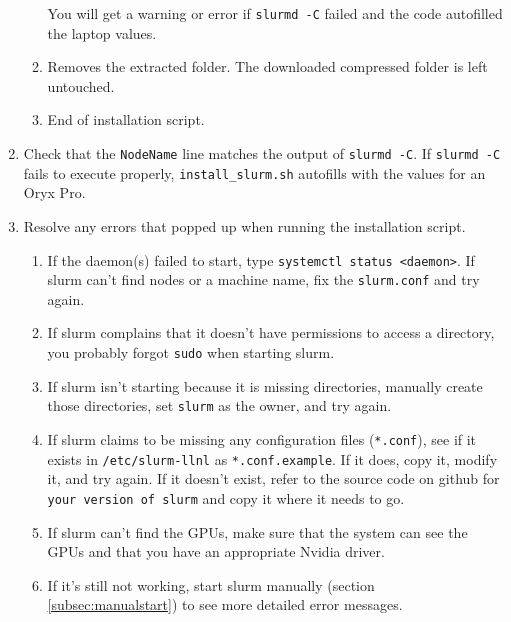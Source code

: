 \begin{enumerate}
\begin{enumerate}
	You will get a warning or error if \texttt{slurmd -C} failed and the code autofilled the laptop values.

	\item Removes the extracted folder. The downloaded compressed folder is left untouched.
	
	\item End of installation script.
	\end{enumerate}
	
\item Check that the \texttt{NodeName} line matches the output of \texttt{slurmd -C}. If \texttt{slurmd -C} fails to execute properly, \texttt{install\_slurm.sh} autofills with the values for an Oryx Pro.

\item Resolve any errors that popped up when running the installation script.

	\begin{enumerate}
	\item If the daemon(s) failed to start, type \texttt{systemctl status <daemon>}. If slurm can't find nodes or a machine name, fix the \texttt{slurm.conf} and try again. 

	\item If slurm complains that it doesn't have permissions to access a directory, you probably forgot \texttt{sudo} when starting slurm.

	\item If slurm isn't starting because it is missing directories, manually create those directories, set \texttt{slurm} as the owner, and try again.

	\item If slurm claims to be missing any configuration files (\texttt{*.conf}), see if it exists in \texttt{/etc/slurm-llnl} as \texttt{*.conf.example}. If it does, copy it, modify it, and try again. If it doesn't exist, refer to the source code on github for \texttt{your version of slurm} and copy it where it needs to go.

	\item If slurm can't find the GPUs, make sure that the system can see the GPUs and that you have an appropriate Nvidia driver.

	\item If it's still not working, start slurm manually (section \ref{subsec:manualstart}) to see more detailed error messages. 
	\end{enumerate}


\end{enumerate}
